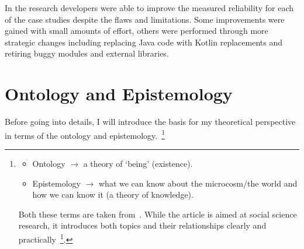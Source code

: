 In the research developers were able to improve the measured reliability for each of the case studies despite the flaws and limitations. Some improvements were gained with small amounts of effort, others were performed through more strategic changes including replacing Java code with Kotlin replacements and retiring buggy modules and external libraries.  

\section{Ontology and Epistemology}
Before going into details, I will introduce the basis for my theoretical perspective in terms of the ontology and epistemology.~\footnote{
\begin{itemize}
    \item Ontology \( \rightarrow \) a theory of `being' (existence).
    \item Epistemology \( \rightarrow \) what we can know about the microcosm/the world and how we can know it (a theory of knowledge).
\end{itemize}

Both these terms are taken from~\cite{marsh2002skin}. While the article is aimed at social science research, it introduces both topics and their relationships clearly and practically~\footnote{Note: newer versions of the introductory material is published in a book: \href{https://www.macmillanihe.com/page/detail/Theory-and-Methods-in-Political-Science/?K=9781137603517}{\emph{``Theory and Methods in Political Science ( Edition)".}}}.
}

